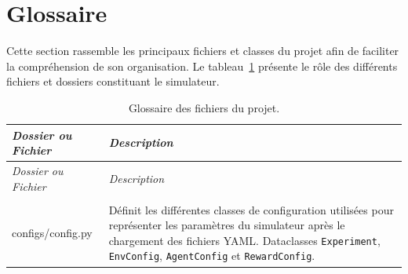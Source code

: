 \section*{Glossaire}

\noindent Cette section rassemble les principaux fichiers et classes du projet afin de faciliter la compréhension de son organisation. Le tableau~\ref{tab:glossary_dir_files} présente le rôle des différents fichiers et dossiers constituant le simulateur.

\begin{longtable}{
        >{\ttfamily\small}p{}
        p{}
    }
    \caption{Glossaire des fichiers du projet.}
    \label{tab:glossary_dir_files}                                                                                                                                                                                                                                                                 \\

    \toprule
    \textnormal{\textit{Dossier ou Fichier}} &
    \textit{Description}                                                                                                                                                                                                                                                                           \\
    \midrule
    \endfirsthead

    \toprule
    \textnormal{\textit{Dossier ou Fichier}} &
    \textit{Description}                                                                                                                                                                                                                                                                           \\
    \midrule
    \endhead

    \midrule
    \\
    \endfoot

    \bottomrule
    \endlastfoot

    configs/config.py
                                             & Définit les différentes classes de configuration utilisées pour représenter les paramètres du simulateur après le chargement des fichiers YAML. Dataclasses \texttt{Experiment}, \texttt{EnvConfig}, \texttt{AgentConfig} et \texttt{RewardConfig}. \\



\end{longtable}
